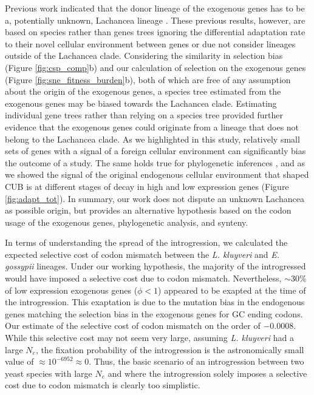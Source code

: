 \documentclass{bmcart}
\newcommand{\kluyveri}{\textit{L. kluyveri}\xspace}
\newcommand{\gossypii}{\textit{E. gossypii}\xspace}
\newcommand{\Ne}{\ensuremath{N_e}\xspace}
\begin{document}
Previous work indicated that the donor lineage of the exogenous genes has to be a, potentially unknown, Lachancea lineage \citep{payen2009, friedrich2015, vakirlis2016, brion2017}.
These previous results, however, are based on species rather than genes trees ignoring the differential adaptation rate to their novel cellular environment between genes or due not consider lineages outside of the Lachancea clade.
Considering the similarity in selection bias (Figure \ref{fig:csp_comp}b) and our calculation of selection on the exogenous genes (Figure \ref{fig:sne_fitness_burden}b), both of which are free of any assumption about the origin of the exogenous genes, a species tree estimated from the exogenous genes may be biased towards the Lachancea clade.
Estimating individual gene trees rather than relying on a species tree provided further evidence that the exogenous genes could originate from a lineage that does not belong to the Lachancea clade.
As we highlighted in this study, relatively small sets of genes with a signal of a foreign cellular environment can significantly bias the outcome of a study. 
The same holds true for phylogenetic inferences \citep{salichos2013}, and as we showed the signal of the original endogenous cellular environment that shaped CUB is at different stages of decay in high and low expression genes (Figure \ref{fig:adapt_tot}).
In summary, our work does not dispute an unknown Lachancea as possible origin, but provides an alternative hypothesis based on the codon usage of the exogenous genes, phylogenetic analysis, and synteny.

In terms of understanding the spread of the introgression, we calculated the expected selective cost of codon mismatch between the \kluyveri and \gossypii lineages.
Under our working hypothesis, the majority of the introgressed would have imposed a selective cost due to codon mismatch.
Nevertheless, $\sim 30 \%$ of low expression exogenous genes ($\phi < 1$) appeared to be exapted at the time of the introgression.
This exaptation is due to the mutation bias in the endogenous genes matching the selection bias in the exogenous genes for GC ending codons.
Our estimate of the selective cost of codon mismatch on the order of $-0.0008$.
While this selective cost may not seem very large, assuming \kluyveri had a large \Ne, the fixation probability of the introgression is the astronomically small value of $\approx 10^{-6952} \approx 0$.
Thus, the basic scenario of an introgression between two yeast species with large \Ne and where the introgression solely imposes a selective cost due to codon mismatch is clearly too simplistic.
\end{document}
